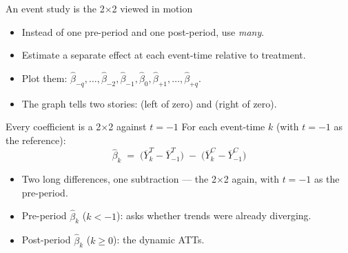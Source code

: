 \documentclass[aspectratio=169,11pt]{beamer}
\begin{document}
\begin{frame}{An event study is the 2$\times$2 viewed in motion}
\vspace{0.6em}
\begin{itemize}\setlength\itemsep{4pt}
  \item Instead of one pre-period and one post-period, use \textit{many}.
  \item Estimate a separate effect at each event-time relative to treatment.
  \item Plot them: $\hat{\beta}_{-q}, \ldots, \hat{\beta}_{-2}, \hat{\beta}_{-1}, \hat{\beta}_{0}, \hat{\beta}_{+1}, \ldots, \hat{\beta}_{+q}$.
  \item The graph tells two stories:  (left of zero) and  (right of zero).
\end{itemize}
\vspace{0.4em}
\end{frame}

\begin{frame}{Every coefficient is a 2$\times$2 against $t = -1$}
\vspace{0.5em}
For each event-time $k$ (with $t = -1$ as the reference):
\vspace{-0.2em}
\[
\hat\beta_k \;=\; \big(\overline{Y}^T_k - \overline{Y}^T_{-1}\big) \;-\; \big(\overline{Y}^C_k - \overline{Y}^C_{-1}\big)
\]
\vspace{0.0em}
\begin{itemize}\setlength\itemsep{4pt}
  \item Two long differences, one subtraction --- the 2$\times$2 again, with $t=-1$ as the pre-period.
  \item Pre-period $\hat\beta_k$ ($k < -1$): asks whether trends were already diverging.
  \item Post-period $\hat\beta_k$ ($k \geq 0$): the dynamic ATTs.
\end{itemize}
\vspace{0.4em}
\end{frame}
\end{document}
